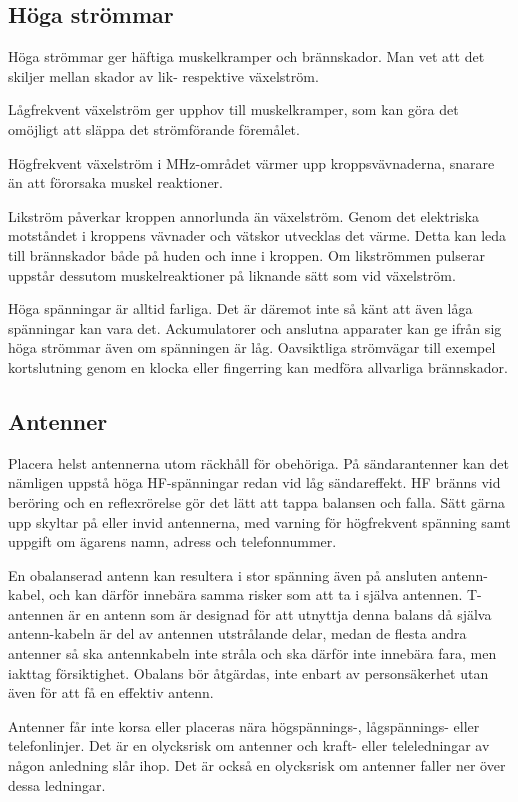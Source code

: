 \subsection{Höga strömmar}

Höga strömmar ger häftiga muskelkramper och brännskador.
Man vet att det skiljer mellan skador av lik- respektive växelström.

Lågfrekvent växelström ger upphov till muskelkramper, som kan göra det
omöjligt att släppa det strömförande föremålet.

Högfrekvent växelström i MHz-området värmer upp kroppsvävnaderna,
snarare än att förorsaka muskel reaktioner.

Likström påverkar kroppen annorlunda än växelström.
Genom det elektriska motståndet i kroppens vävnader och vätskor utvecklas det
värme.
Detta kan leda till brännskador både på huden och inne i kroppen.
Om likströmmen pulserar uppstår dessutom muskelreaktioner på liknande sätt som
vid växelström.

Höga spänningar är alltid farliga.
Det är däremot inte så känt att även låga spänningar kan vara det.
Ackumulatorer och anslutna apparater kan ge ifrån sig höga strömmar även om
spänningen är låg.
Oavsiktliga strömvägar till exempel kortslutning genom en klocka eller fingerring kan
medföra allvarliga brännskador.

\subsection{Antenner}

Placera helst antennerna utom räckhåll för obehöriga.
På sändarantenner kan det nämligen uppstå höga HF-spänningar redan vid
låg sändareffekt.
HF bränns vid beröring och en reflexrörelse gör det lätt att tappa balansen och
falla.
Sätt gärna upp skyltar på eller invid antennerna, med varning för högfrekvent
spänning samt uppgift om ägarens namn, adress och telefonnummer.

En obalanserad antenn kan resultera i stor spänning även på ansluten
antenn-kabel, och kan därför innebära samma risker som att ta i själva antennen.
T-antennen är en antenn som är designad för att utnyttja denna balans då själva
antenn-kabeln är del av antennen utstrålande delar, medan de flesta andra
antenner så ska antennkabeln inte stråla och ska därför inte innebära fara,
men iakttag försiktighet.
Obalans bör åtgärdas, inte enbart av personsäkerhet utan även för att få en
effektiv antenn.

Antenner får inte korsa eller placeras nära högspännings-, lågspännings- eller
telefonlinjer.
Det är en olycksrisk om antenner och kraft- eller teleledningar av någon
anledning slår ihop.
Det är också en olycksrisk om antenner faller ner över dessa ledningar.

